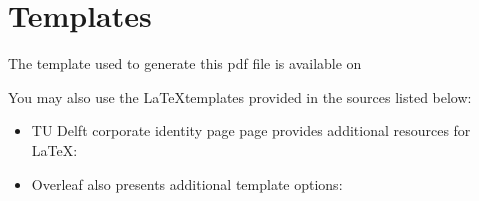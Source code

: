 \chapter{Templates} 
The template used to generate this pdf file is available on \href{https://www.overleaf.com/read/ykgytrszffyx
}{\color{tudelft-cyan}{https://www.overleaf.com/read/ykgytrszffyx
}}
\par 
You may also use the  \LaTeX templates provided in the sources listed below:
\begin{itemize}
    \item TU Delft corporate identity page page provides additional resources for \LaTeX: \\ \href{https://www.tudelft.nl/huisstijl/downloads}{\color{tudelft-cyan}{www.tudelft.nl/huisstijl/downloads}}
    \item Overleaf also presents additional template options: \href{https://www.overleaf.com/edu/tudelft#templates}{\color{tudelft-cyan}{www.overleaf.com/edu/tudelft\#templates}}
\end{itemize}